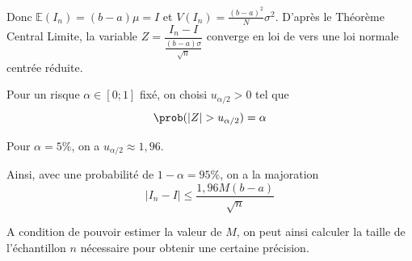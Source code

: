 Donc $\mathbb{E}(I_n) = (b-a) \mu = I$ et $V(I_n) = \frac{(b-a)^2}{N} \sigma^2$. D'après le Théorème Central Limite, la variable $Z=\dfrac{I_n-I}{\frac{(b-a)\sigma}{\sqrt{n}}}$ converge en loi de vers une loi normale centrée réduite. 

Pour un risque $\alpha \in [0;1]$ fixé, on choisi $u_{\alpha/2}>0$ tel que $$\prob(|Z|>u_{\alpha/2}) = \alpha$$

Pour $\alpha = 5\%$, on a $u_{\alpha/2} \approx 1{,}96$. 

Ainsi, avec une probabilité de $1-\alpha = 95\%$, on a la majoration 
$$|I_n-I| \leq \frac{1{,96}M(b-a)}{\sqrt{n}}$$

A condition de pouvoir estimer la valeur de $M$, on peut ainsi calculer la taille de l'échantillon $n$ nécessaire pour obtenir une certaine précision.